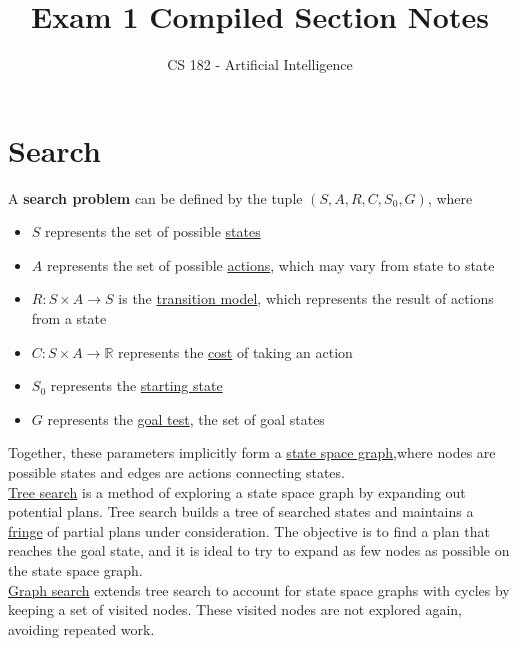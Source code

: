 \documentclass[a4paper]{article}
\title{Exam 1 Compiled Section Notes}
\author{CS 182 - Artificial Intelligence}
\date{}
\begin{document}
\maketitle

\section{Search}
\renewcommand{\labelenumii}{\arabic{enumii}.}
\setlength{\parindent}{0pt}

A \textbf{search problem} can be defined by the tuple
$(S, A, R, C, S_0, G)$, where
\begin{itemize}
\item $S$ represents the set of possible \underline{states}

\item $A$ represents the set of possible \underline{actions}, which may vary
from state to state

\item $R : S \times A \rightarrow S$ is the \underline{transition model},
which represents the result of actions from a state

\item $C : S \times A \rightarrow \mathbb{R}$ represents the \underline{cost}
of taking an action

\item $S_0$ represents the \underline{starting state}

\item $G$ represents the \underline{goal test}, the set of {goal states}
\end{itemize}

Together, these parameters implicitly form a \underline{state space graph},where nodes are possible states and edges are actions connecting states.\\

\underline{Tree search} is a method of exploring a state space graph by expanding out potential plans. Tree search builds a tree of searched states and maintains a \underline{fringe} of partial plans under consideration. The objective is to find a plan that reaches the goal state, and it is ideal to try to expand as few nodes as possible on the state space graph.\\

\underline{Graph search} extends tree search to account for state space graphs with cycles by keeping a set of visited nodes. These visited nodes are not explored again, avoiding repeated work.\\
\end{document}
